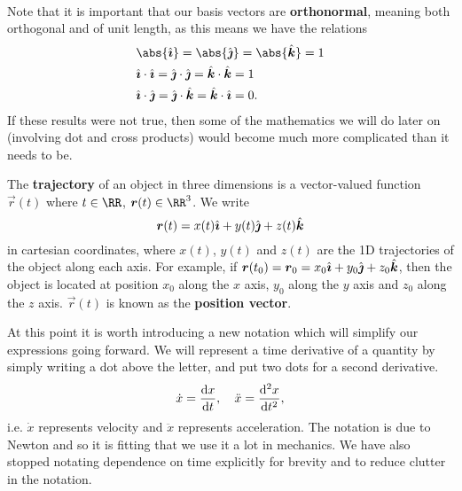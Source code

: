 \documentclass[../classical_mechanics.tex]{subfiles}
\begin{document}
        \paragraph{}
        Note that it is important that our basis vectors are \textbf{orthonormal}, meaning both orthogonal and of unit length, as this means we have the relations
        \begin{align}
            &\abs{\ihat}=\abs{\jhat}=\abs{\khat}=1\label{eq:basis-vec-magnitude}\\
            &\ihat\cdot\ihat=\jhat\cdot\jhat=\khat\cdot\khat=1\label{eq:basis-vec-normal}\\
            &\ihat\cdot\jhat=\jhat\cdot\khat=\khat\cdot\ihat=0\label{eq:basis-vec-ortho}.
        \end{align}
        If these results were not true, then some of the mathematics we will do later on (involving dot and cross products) would become much more complicated than it needs to be.
        \begin{definition}
            The \textbf{trajectory} of an object in three dimensions is a vector-valued function $\vec{r}(t)$ where $t\in\RR$, $\vec{r}(t)\in\RR^3$.
            We write
            \begin{equation}
                \boldsymbol{r}(t)=x(t)\hat{\boldsymbol{\imath}}+y(t)\hat{\boldsymbol{\jmath}}+z(t)\hat{\boldsymbol{k}}
            \end{equation}
            in cartesian coordinates, where $x(t)$, $y(t)$ and $z(t)$ are the 1D trajectories of the object along each axis.
            For example, if $\boldsymbol{r}(t_0)=\boldsymbol{r}_0=x_0\hat{\boldsymbol{\imath}}+y_0\hat{\boldsymbol{\jmath}}+z_0\hat{\boldsymbol{k}}$, then the object is located at position $x_0$ along the $x$ axis, $y_0$ along the $y$ axis and $z_0$ along the $z$ axis.
            $\vec{r}(t)$ is known as the \textbf{position vector}.
        \end{definition}
        At this point it is worth introducing a new notation which will simplify our expressions going forward.
        We will represent a time derivative of a quantity by simply writing a dot above the letter, and put two dots for a second derivative.
        \begin{equation}
            \dot{x}=\dv{x}{t},\quad\ddot{x}=\dv[2]{x}{t},
        \end{equation}
        i.e. $\dot x$ represents velocity and $\ddot x$ represents acceleration.
        The notation is due to Newton and so it is fitting that we use it a lot in mechanics.
        We have also stopped notating dependence on time explicitly for brevity and to reduce clutter in the notation.
\end{document}
